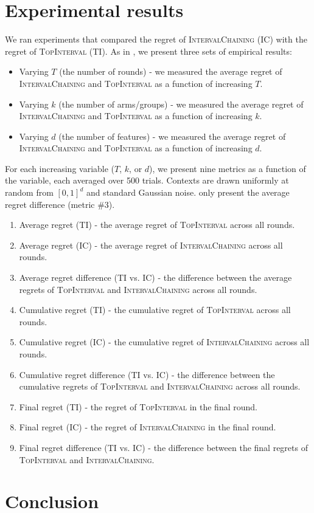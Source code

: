 \documentclass[11pt]{article}
\begin{document}
\section{Experimental results}

We ran experiments that compared the regret of \textsc{IntervalChaining} (IC) with the regret of \textsc{TopInterval} (TI). As in , we present three sets of empirical results: 
\begin{itemize}
	\item Varying $T$ (the number of rounds) - we measured the average regret of \textsc{IntervalChaining} and \textsc{TopInterval} as a function of increasing $T$.
	\item Varying $k$ (the number of arms/groups) - we measured the average regret of \textsc{IntervalChaining} and \textsc{TopInterval} as a function of increasing $k$.
	\item Varying $d$ (the number of features) - we measured the average regret of \textsc{IntervalChaining} and \textsc{TopInterval} as a function of increasing $d$.
\end{itemize} 

For each increasing variable ($T$, $k$, or $d$), we present nine metrics as a function of the variable, each averaged over 500 trials. Contexts are drawn uniformly at random from $[0,1]^d$ and standard Gaussian noise.  only present the average regret difference (metric \#3).
\begin{enumerate}
	\item Average regret (TI) - the average regret of \textsc{TopInterval} across all rounds.
	\item Average regret (IC) - the average regret of \textsc{IntervalChaining} across all rounds.
	\item Average regret difference (TI vs. IC) - the difference between the average regrets of \textsc{TopInterval} and \textsc{IntervalChaining} across all rounds.
	\item Cumulative regret (TI) - the cumulative regret of \textsc{TopInterval} across all rounds.
	\item Cumulative regret (IC) - the cumulative regret of \textsc{IntervalChaining} across all rounds.
	\item Cumulative regret difference (TI vs. IC) - the difference between the cumulative regrets of \textsc{TopInterval} and \textsc{IntervalChaining} across all rounds.
	\item Final regret (TI) - the regret of \textsc{TopInterval} in the final round.
	\item Final regret (IC) - the regret of \textsc{IntervalChaining} in the final round.
	\item Final regret difference (TI vs. IC) - the difference between the final regrets of \textsc{TopInterval} and \textsc{IntervalChaining}.
\end{enumerate}

\section{Conclusion}



\end{document}
